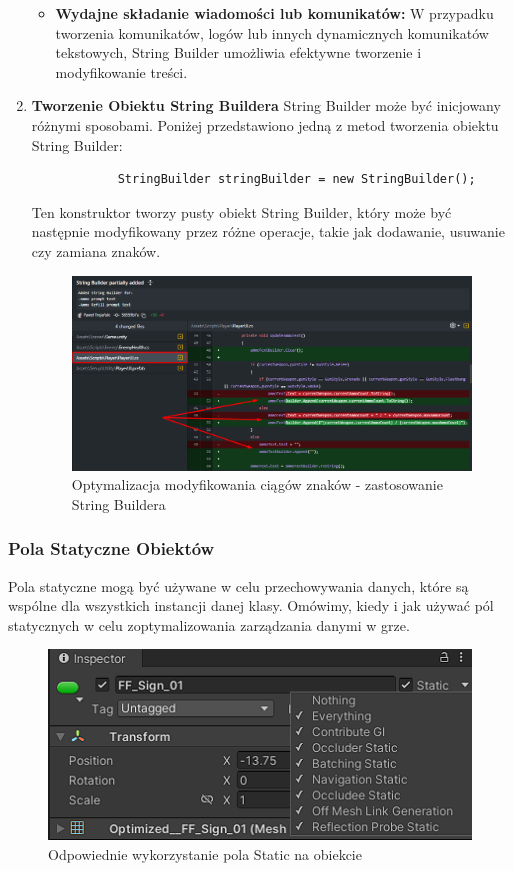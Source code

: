 \begin{enumerate}
\begin{itemize}
        \item \textbf{Wydajne składanie wiadomości lub komunikatów:} W przypadku tworzenia komunikatów, logów lub innych dynamicznych komunikatów tekstowych, String Builder umożliwia efektywne tworzenie i modyfikowanie treści.
        \end{itemize}
    \item \textbf{Tworzenie Obiektu String Buildera}
        String Builder może być inicjowany różnymi sposobami. Poniżej przedstawiono jedną z metod tworzenia obiektu String Builder:
        \begin{verbatim}
            StringBuilder stringBuilder = new StringBuilder();
        \end{verbatim}
        Ten konstruktor tworzy pusty obiekt String Builder, który może być następnie modyfikowany przez różne operacje, takie jak dodawanie, usuwanie czy zamiana znaków.
        \begin{figure}[h]
            \centering
            \includegraphics[width=1\linewidth]{Images/stringBuilder.png}
            \caption{Optymalizacja modyfikowania ciągów znaków - zastosowanie String Buildera}
        \end{figure}
\end{enumerate}
\FloatBarrier

\subsubsection{Pola Statyczne Obiektów}
Pola statyczne mogą być używane w celu przechowywania danych, które są wspólne dla wszystkich instancji danej klasy. Omówimy, kiedy i jak używać pól statycznych w celu zoptymalizowania zarządzania danymi w grze.
\begin{figure}[h]
    \centering
    \includegraphics{Images/staticField.png}
    \caption{Odpowiednie wykorzystanie pola Static na obiekcie}
\end{figure}
